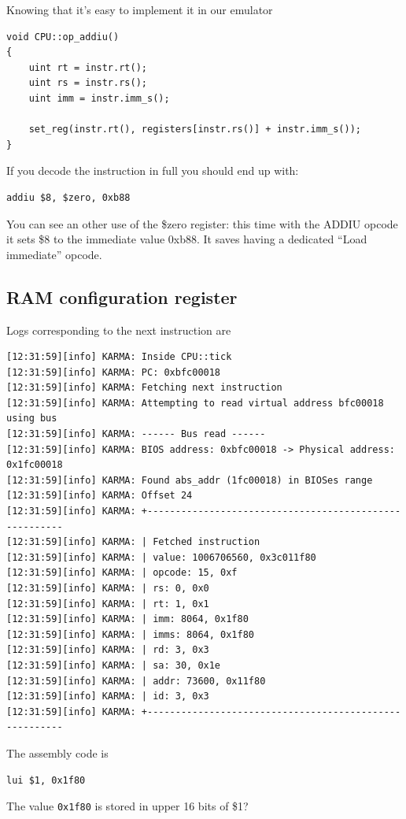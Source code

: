 \documentclass[a4paper]{article}
\newcommand{\code}[1] {\texttt{#1}}
\begin{document}
Knowing that it's easy to implement it in our emulator

\begin{lstlisting}
void CPU::op_addiu()
{
	uint rt = instr.rt();
	uint rs = instr.rs();
	uint imm = instr.imm_s();

	set_reg(instr.rt(), registers[instr.rs()] + instr.imm_s());
}
\end{lstlisting}

If you decode the instruction in full you should end up with:

\begin{lstlisting}[language=assembly]
addiu $8, $zero, 0xb88
\end{lstlisting}

You can see an other use of the \$zero register: this time with the
ADDIU opcode it sets \$8 to the immediate value 0xb88. It saves having
a dedicated ``Load immediate'' opcode.

\subsection{RAM configuration register}

Logs corresponding to the next instruction are
\begin{verbatim}
[12:31:59][info] KARMA: Inside CPU::tick
[12:31:59][info] KARMA: PC: 0xbfc00018
[12:31:59][info] KARMA: Fetching next instruction
[12:31:59][info] KARMA: Attempting to read virtual address bfc00018 using bus
[12:31:59][info] KARMA: ------ Bus read ------
[12:31:59][info] KARMA: BIOS address: 0xbfc00018 -> Physical address: 0x1fc00018
[12:31:59][info] KARMA: Found abs_addr (1fc00018) in BIOSes range
[12:31:59][info] KARMA: Offset 24
[12:31:59][info] KARMA: +-------------------------------------------------------
[12:31:59][info] KARMA: | Fetched instruction 
[12:31:59][info] KARMA: | value: 1006706560, 0x3c011f80
[12:31:59][info] KARMA: | opcode: 15, 0xf
[12:31:59][info] KARMA: | rs: 0, 0x0
[12:31:59][info] KARMA: | rt: 1, 0x1
[12:31:59][info] KARMA: | imm: 8064, 0x1f80
[12:31:59][info] KARMA: | imms: 8064, 0x1f80
[12:31:59][info] KARMA: | rd: 3, 0x3
[12:31:59][info] KARMA: | sa: 30, 0x1e
[12:31:59][info] KARMA: | addr: 73600, 0x11f80
[12:31:59][info] KARMA: | id: 3, 0x3
[12:31:59][info] KARMA: +-------------------------------------------------------
\end{verbatim}

The assembly code is
\begin{lstlisting}[language=assembly, label={asm:lui11f80}]
lui $1, 0x1f80
\end{lstlisting}
The value \code{0x1f80} is stored in upper 16 bits of \$1?
\end{document}
